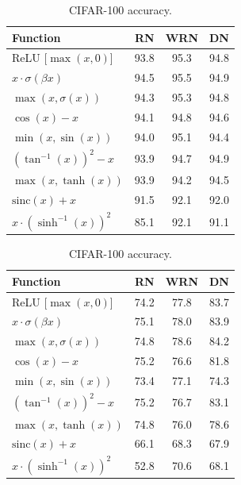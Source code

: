 \documentclass{article} %
\begin{document}
\begin{table}[h!]
\centering
\small
\parbox{.49\linewidth}{
\begin{tabular}{lccc}
\toprule[0.25mm]
\bf{Function} & \bf{RN} & \bf{WRN} & \bf{DN}     \\
\midrule
ReLU [$\max(x, 0)$]         & 93.8      & 95.3      & 94.8      \\
\midrule
$x\cdot\sigma(\beta x)$     & 94.5      & 95.5      & 94.9      \\
$\max(x, \sigma(x))$        & 94.3      & 95.3      & 94.8      \\
$\cos(x) - x$               & 94.1      & 94.8      & 94.6      \\
$\min(x, \sin(x))$          & 94.0      & 95.1      & 94.4      \\
$(\tan^{-1}(x))^2 - x$      & 93.9      & 94.7      & 94.9      \\
$\max(x, \tanh(x))$         & 93.9      & 94.2      & 94.5      \\
$\text{sinc}(x) + x$        & 91.5      & 92.1      & 92.0      \\
$x\cdot (\sinh^{-1}(x))^2$  & 85.1      & 92.1      & 91.1      \\
\bottomrule[0.25mm]
\end{tabular}
\caption{CIFAR-10 accuracy.}
\label{table:nas-act-cifar10-accuracy}
}
\parbox{.49\linewidth}{
\begin{tabular}{lccc}
\toprule[0.25mm]
\bf{Function} & \bf{RN} & \bf{WRN} & \bf{DN}     \\
\midrule
ReLU [$\max(x, 0)$]         & 74.2      & 77.8      & 83.7      \\
\midrule
$x\cdot\sigma(\beta x)$     & 75.1      & 78.0      & 83.9      \\
$\max(x, \sigma(x))$        & 74.8      & 78.6      & 84.2      \\
$\cos(x) - x$               & 75.2      & 76.6      & 81.8      \\
$\min(x, \sin(x))$          & 73.4      & 77.1      & 74.3      \\
$(\tan^{-1}(x))^2 - x$      & 75.2      & 76.7      & 83.1      \\
$\max(x, \tanh(x))$         & 74.8      & 76.0      & 78.6      \\
$\text{sinc}(x) + x$        & 66.1      & 68.3      & 67.9      \\
$x\cdot (\sinh^{-1}(x))^2$  & 52.8      & 70.6      & 68.1      \\
\bottomrule[0.25mm]
\end{tabular}
\caption{CIFAR-100 accuracy.}
\label{table:nas-act-cifar100-accuracy}
}
\end{table}
\end{document}
